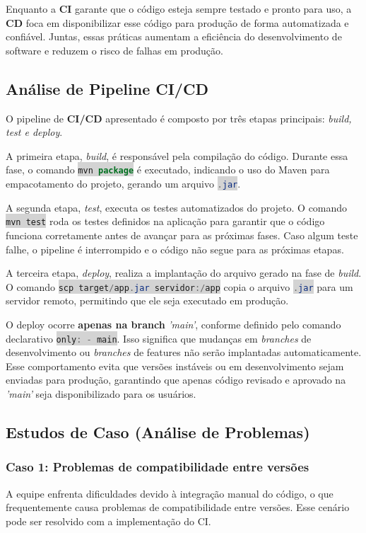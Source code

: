 \documentclass[a4paper,12pt]{article}
\newcommand{\inlinecode}[2]{\colorbox{lightgray}{\lstinline[language=#1]$#2$}}
\begin{document}
Enquanto a \textbf{CI} garante que o código esteja sempre testado e pronto para uso, a \textbf{CD} foca em disponibilizar esse código para produção de forma automatizada e confiável. Juntas, essas práticas aumentam a eficiência do desenvolvimento de software e reduzem o risco de falhas em produção.  

\subsection*{Análise de Pipeline CI/CD}  
O pipeline de \textbf{CI/CD} apresentado é composto por três etapas principais: \textit{build, test e deploy}.  

A primeira etapa, \textit{build}, é responsável pela compilação do código. Durante essa fase, o comando \inlinecode{java}{mvn package} é executado, indicando o uso do Maven para empacotamento do projeto, gerando um arquivo \inlinecode{java}{.jar}.  

A segunda etapa, \textit{test}, executa os testes automatizados do projeto. O comando \inlinecode{java}{mvn test} roda os testes definidos na aplicação para garantir que o código funciona corretamente antes de avançar para as próximas fases. Caso algum teste falhe, o pipeline é interrompido e o código não segue para as próximas etapas.  

A terceira etapa, \textit{deploy}, realiza a implantação do arquivo gerado na fase de \textit{build}. O comando \inlinecode{java}{scp target/app.jar servidor:/app} copia o arquivo \inlinecode{java}{.jar} para um servidor remoto, permitindo que ele seja executado em produção.  

O deploy ocorre \textbf{apenas na branch} \textit{'main'}, conforme definido pelo comando declarativo \inlinecode{java}{only: - main}. Isso significa que mudanças em \textit{branches} de desenvolvimento ou \textit{branches} de features não serão implantadas automaticamente. Esse comportamento evita que versões instáveis ou em desenvolvimento sejam enviadas para produção, garantindo que apenas código revisado e aprovado na \textit{'main'} seja disponibilizado para os usuários.  

\subsection*{Estudos de Caso (Análise de Problemas)}  

\subsubsection*{Caso 1: Problemas de compatibilidade entre versões}  
A equipe enfrenta dificuldades devido à integração manual do código, o que frequentemente causa problemas de compatibilidade entre versões. Esse cenário pode ser resolvido com a implementação do CI.  
\end{document}
